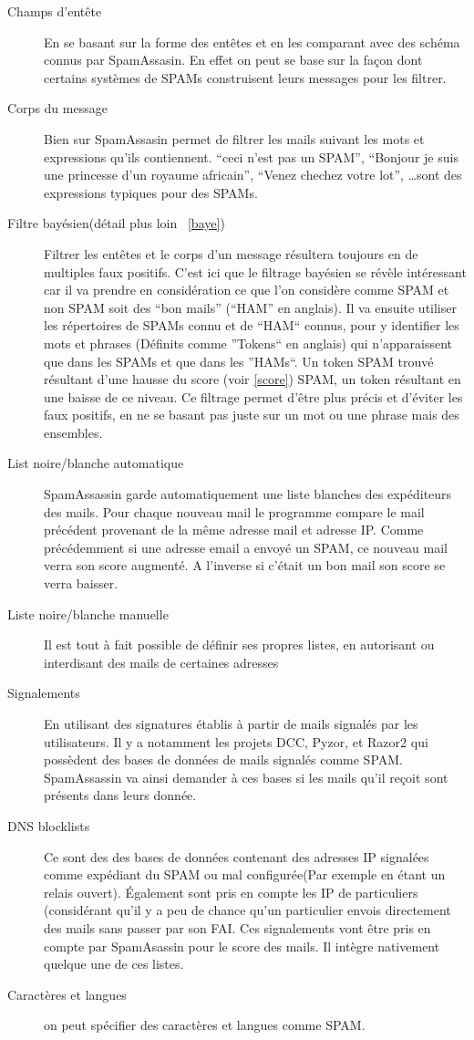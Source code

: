 \documentclass[a4paper,11pt]{article}
\begin{document}
\begin{description}
 \item [Champs d'entête] En se basant sur la forme des entêtes et en les comparant avec des schéma connus par SpamAssasin. En effet 
 on peut se base sur la façon dont certains systèmes de SPAMs construisent leurs messages pour les filtrer. 
 \item [Corps du message] Bien sur SpamAssasin permet de filtrer les mails suivant les mots et expressions qu'ils contiennent. 
 ``ceci n'est pas un SPAM'', ``Bonjour je suis une princesse d'un royaume africain'', ``Venez chechez votre lot'', \dots sont des expressions
 typiques pour des SPAMs. 
 \item [Filtre bayésien(détail plus loin ~\ref{baye})] Filtrer les entêtes et le corps d'un message résultera toujours en de multiples faux positifs. C'est ici que le filtrage 
 bayésien se révèle intéressant car il va prendre en considération ce que l'on considère comme SPAM et non SPAM soit des ``bon mails'' (``HAM'' en anglais).
 Il va ensuite utiliser les répertoires de SPAMs connu et de ``HAM``  connus, pour y identifier les mots et phrases (Définits comme ''Tokens`` en anglais)
 qui n'apparaissent que dans les SPAMs et que dans les ''HAMs``.
 Un token SPAM trouvé résultant d'une hausse du score (voir \ref{score}) SPAM, un token résultant en une baisse de ce niveau. Ce filtrage permet d'être plus précis et d'éviter les faux positifs, 
 en ne se basant pas juste sur un mot ou une phrase mais des ensembles. 
 \item [List noire/blanche automatique] SpamAssassin garde automatiquement une liste blanches des expéditeurs des mails.
 Pour chaque nouveau mail le programme compare le mail précédent provenant de la même adresse mail et adresse IP.
 Comme précédemment si une adresse email a envoyé un SPAM, ce nouveau mail verra son score augmenté. A l'inverse si c'était un bon mail son score 
 se verra baisser.
 \item [Liste noire/blanche manuelle] Il est tout à fait possible de définir ses propres listes, en autorisant ou 
 interdisant des mails de certaines adresses
 \item [Signalements] En utilisant des signatures établis à partir de mails signalés par les utilisateurs. Il y a notamment les projets DCC, Pyzor, et Razor2
 qui possèdent des bases de données de mails signalés comme SPAM. SpamAssassin va ainsi demander à ces bases si les mails qu'il reçoit 
 sont présents dans leurs donnée.
 \item [DNS blocklists] Ce sont des des bases de données contenant des adresses IP signalées comme expédiant du SPAM ou mal 
 configurée(Par exemple en étant un relais ouvert). Également sont pris en compte les IP de particuliers (considérant qu'il y a peu de chance
qu'un particulier envois directement des mails sans passer par son FAI. Ces signalements vont être pris en compte par SpamAsassin pour le score des mails.
Il intègre nativement quelque une de ces listes.
\item [Caractères et langues] on peut spécifier des caractères et langues comme SPAM.


\end{description}
\end{document}
